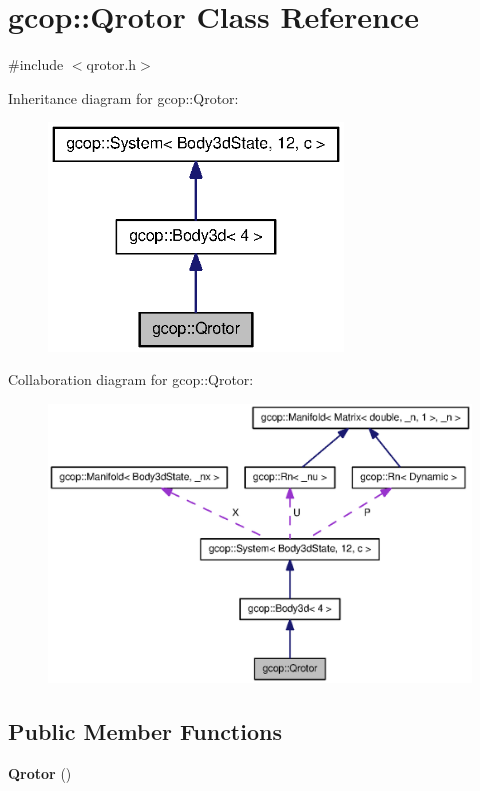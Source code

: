 \section{gcop\-:\-:\-Qrotor \-Class \-Reference}
\label{classgcop_1_1Qrotor}


{\ttfamily \#include $<$qrotor.\-h$>$}



\-Inheritance diagram for gcop\-:\-:\-Qrotor\-:
\nopagebreak
\begin{figure}[H]
\begin{center}
\leavevmode
\includegraphics[width=222pt]{classgcop_1_1Qrotor__inherit__graph}
\end{center}
\end{figure}


\-Collaboration diagram for gcop\-:\-:\-Qrotor\-:
\nopagebreak
\begin{figure}[H]
\begin{center}
\leavevmode
\includegraphics[width=350pt]{classgcop_1_1Qrotor__coll__graph}
\end{center}
\end{figure}
\subsection*{\-Public \-Member \-Functions}
\begin{DoxyCompactItemize}
\item 
{\bf \-Qrotor} ()
\end{DoxyCompactItemize}
